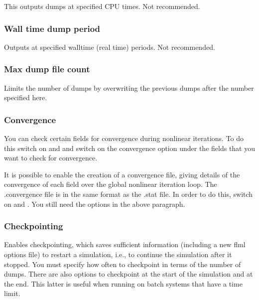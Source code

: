 This outputs dumps at specified CPU times. Not recommended.

\subsubsection{Wall time dump period}

Outputs at specified walltime (real time) periods. Not recommended.

\subsubsection{Max dump file count}

Limits the number of dumps by overwriting the previous dumps after the number specified here.

\subsubsection{Convergence}

You can check certain fields for convergence during nonlinear iterations.  To do this switch on  and  and switch on the convergence option under the fields that you want to check for convergence. 

It is possible to enable the creation of a convergence file, giving details of the convergence of each field over the global nonlinear iteration loop. The .convergence file is in the same format as the .stat file. In order to do this, switch on 
  and .  You still need the options in the above paragraph.

\subsubsection{Checkpointing}
\label{sec:configuring_fluidity_checkpointing}
Enables checkpointing, which saves sufficient information (including a new flml options file) to restart a simulation, i.e., to continue the simulation after it stopped. You must specify how often to checkpoint in terms of the number of dumps. There are also options to checkpoint at the start of the simulation and at the end. This latter is useful when running on batch systems that have a time limit.

